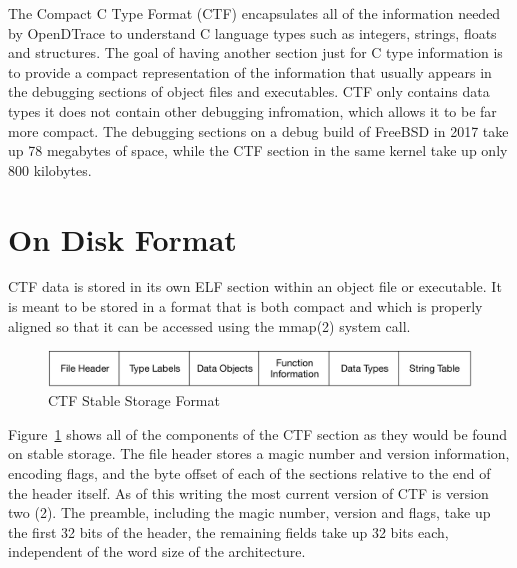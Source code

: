 The Compact C Type Format (CTF) encapsulates all of the information
needed by OpenDTrace to understand C language types such as integers,
strings, floats and structures.  The goal of having another section
just for C type information is to provide a compact representation of
the information that usually appears in the debugging sections of
object files and executables.  CTF only contains data types it
does not contain other debugging infromation, which allows it to be
far more compact.  The debugging sections on a debug build of FreeBSD
in 2017 take up 78 megabytes of space, while the CTF section in the
same kernel take up only 800 kilobytes. 

\section{On Disk Format}
\label{sec:ctf-on-disk-format}

CTF data is stored in its own ELF section within an object file or
executable.  It is meant to be stored in a format that is both compact
and which is properly aligned so that it can be accessed using the
mmap(2) system call.

\begin{figure}[h]
  \centering
  \includegraphics[width=.8\textwidth]{ctf-stable-format}
  \caption{CTF Stable Storage Format}
  \label{fig:ctf-stable-storage-format}
\end{figure}

Figure~\ref{fig:ctf-stable-storage-format} shows all of the components
of the CTF section as they would be found on stable storage.  The file
header stores a magic number and version information, encoding flags,
and the byte offset of each of the sections relative to the end of the
header itself.  As of this writing the most current version of CTF is
version two (2).  The preamble, including the magic number, version
and flags, take up the first 32 bits of the header, the remaining
fields take up 32 bits each, independent of the word size of the
architecture.

